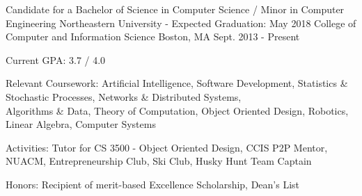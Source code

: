 


\begin{cventries}

  \cventry
    {Candidate for a Bachelor of Science in Computer Science / Minor in Computer Engineering} %
    {Northeastern University - Expected Graduation: May 2018 \newline College of Computer and Information Science} %
    {Boston, MA} %
    {Sept. 2013 - Present} %
    {
      \begin{cvitems} %
        \item {Current GPA: 3.7 / 4.0}
        \item {Relevant Coursework: Artificial Intelligence, Software Development, Statistics \& Stochastic Processes, Networks \& Distributed Systems,\\
            \hspace*{2.95cm} Algorithms \& Data, Theory of Computation, Object Oriented Design, Robotics, Linear Algebra, Computer Systems}
        \item {Activities: Tutor for CS 3500 - Object Oriented Design, CCIS P2P Mentor, NUACM, Entrepreneurship Club, Ski Club, Husky Hunt Team Captain}
        \item {Honors: Recipient of merit-based Excellence Scholarship, Dean's List}
      \end{cvitems}
    }

\end{cventries}
